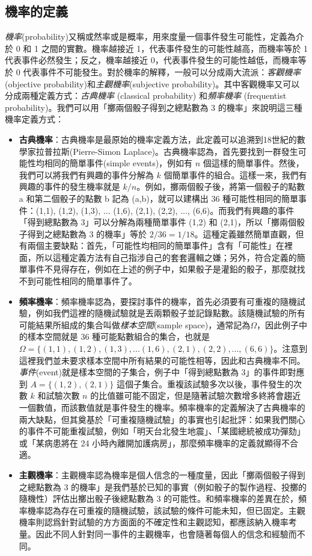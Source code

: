 \subsection{機率的定義}
    \textit{機率}(probability)又稱或然率或是概率，用來度量一個事件發生可能性，定義為介於 0 和 1 之間的實數。機率越接近 1，代表事件發生的可能性越高，而機率等於 1 代表事件必然發生；反之，機率越接近 0，代表事件發生的可能性越低，而機率等於 0 代表事件不可能發生。對於機率的解釋，一般可以分成兩大流派：\textit{客觀機率}(objective probability)和\textit{主觀機率}(subjective probability)。其中客觀機率又可以分成兩種定義方式：\textit{古典機率} (classical probability) 和\textit{頻率機率} (frequentist probability)。我們可以用「擲兩個骰子得到之總點數為 3 的機率」來說明這三種機率定義方式：
    \begin{itemize}
        \item \textbf{古典機率}：古典機率是最原始的機率定義方法，此定義可以追溯到18世紀的數學家拉普拉斯(Pierre-Simon Laplace)。古典機率認為，首先要找到一群發生可能性均相同的簡單事件(simple events)，例如有 $n$ 個這樣的簡單事件。然後，我們可以將我們有興趣的事件分解為 $k$ 個簡單事件的組合。這樣一來，我們有興趣的事件的發生機率就是 $k/n$。例如，擲兩個骰子後，將第一個骰子的點數 a 和第二個骰子的點數 b 記為 (a,b)，就可以建構出 36 種可能性相同的簡單事件：(1,1), (1,2), (1,3), ... (1,6), (2,1), (2,2), ..., (6,6)。而我們有興趣的事件「得到總點數為 3」可以分解為兩種簡單事件 (1,2) 和 (2,1)，所以「擲兩個骰子得到之總點數為 3 的機率」等於 $2/36 = 1/18$。這種定義雖然簡單直觀，但有兩個主要缺點：首先，「可能性均相同的簡單事件」含有「可能性」在裡面，所以這種定義方法有自己指涉自己的套套邏輯之嫌；另外，符合定義的簡單事件不見得存在，例如在上述的例子中，如果骰子是灌鉛的骰子，那麼就找不到可能性相同的簡單事件了。
        \item \textbf{頻率機率}：頻率機率認為，要探討事件的機率，首先必須要有可重複的隨機試驗，例如我們這裡的隨機試驗就是丟兩顆骰子並記錄點數。該隨機試驗的所有可能結果所組成的集合叫做\textit{樣本空間}(sample space)，通常記為$\Omega$，因此例子中的樣本空間就是 36 種可能點數組合的集合，也就是 $\Omega = \{(1,1), (1,2), (1,3), ... (1,6), (2,1), (2,2), ..., (6,6)\}$。注意到這裡我們並未要求樣本空間中所有結果的可能性相等，因此和古典機率不同。\textit{事件}(event)就是樣本空間的子集合，例子中「得到總點數為 3」的事件即對應到 $A = \{(1,2),(2,1)\}$ 這個子集合。重複該試驗多次以後，事件發生的次數 $k$ 和試驗次數 $n$ 的比值雖可能不固定，但是隨著試驗次數增多終將會趨近一個數值，而該數值就是事件發生的機率。頻率機率的定義解決了古典機率的兩大缺點，但其奠基於「可重複隨機試驗」的事實也引起批評：如果我們關心的事件不可能重複試驗，例如「明天台北發生地震」、「某國總統被成功彈劾」或「某病患將在 24 小時內離開加護病房」，那麼頻率機率的定義就顯得不合適。
        \item \textbf{主觀機率}：主觀機率認為機率是個人信念的一種度量，因此「擲兩個骰子得到之總點數為 3 的機率」是我們基於已知的事實（例如骰子的製作過程、投擲的隨機性）評估出擲出骰子後總點數為 3 的可能性。和頻率機率的差異在於，頻率機率認為存在可重複的隨機試驗，該試驗的條件可能未知，但已固定。主觀機率則認爲針對試驗的方方面面的不確定性和主觀認知，都應該納入機率考量。因此不同人針對同一事件的主觀機率，也會隨著每個人的信念和經驗而不同。
    \end{itemize}
